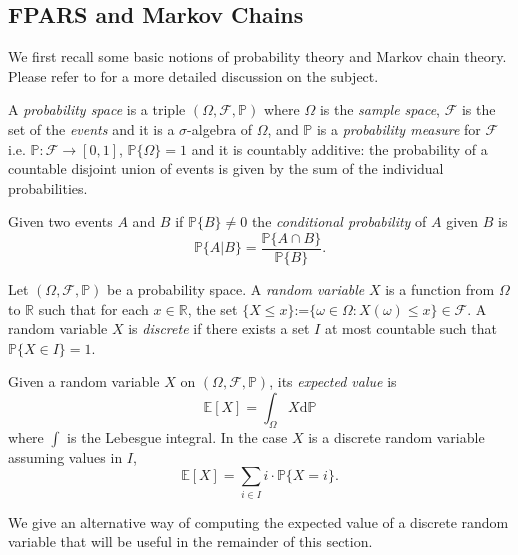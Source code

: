 \begin{LONG}
	\section{FPARS and Markov Chains}
	We first recall some basic notions of probability theory and Markov chain theory. Please refer to \cite{ash_probability_1999,norris_markov_1998} for a more detailed discussion on the subject.
	\begin{definition}
		A \emph{probability space} is a triple $(\Omega, \mathcal{F},\mathbb{P})$ where $\Omega$ is the \emph{sample space}, $\mathcal{F}$ is the set of the \emph{events} and it is a $\sigma$-algebra of $\Omega$, and $\mathbb{P}$ is a \emph{probability measure} for $\mathcal{F}$ i.e. $\mathbb{P} :\mathcal{F}\rightarrow[0,1]$, $\mathbb{P}\{\Omega\}=1$ and it is countably additive: the probability of a countable disjoint union of events is given by the sum of the individual probabilities.
	\end{definition}
	\begin{definition}
		Given two events $A$ and $B$ if $\mathbb{P}\{B\}\neq 0$ the \emph{conditional probability} of $A$ given $B$ is
		$$
		\mathbb{P}\{A|B\}=\frac{\mathbb{P}\{A\cap B\}}{\mathbb{P}\{B\}}.
		$$
	\end{definition}
	\begin{definition}
		Let $(\Omega, \mathcal{F},\mathbb{P})$ be a probability space. A \emph{random variable} $X$ is a function from $\Omega$ to $\mathbb{R}$ such that for each $x\in \mathbb{R}$, the set $\{X\leq x\}$:=$\{\omega\in\Omega : X(\omega)\leq x\}\in \mathcal{F}$. A random variable $X$ is \emph{discrete} if there exists a set $I$ at most countable such that $\mathbb{P}\{X\in I\}=1$.
	\end{definition} 
	\begin{definition}
		Given a random variable $X$ on $(\Omega, \mathcal{F},\mathbb{P})$, its \emph{expected value} is
		$$
		\mathbb{E}[X]=\int_{\Omega}X\mathrm{d}\mathbb{P}
		$$
		where $\int$ is the Lebesgue integral. In the case $X$ is a discrete random variable assuming values in $I$,
		$$
		\mathbb{E}[X]=\sum_{i\in I}i\cdot\mathbb{P}\{X=i\}.
		$$
	\end{definition}
	We give an alternative way of computing the expected value of a discrete random variable that will be useful in the remainder of this section.
	\begin{proposition}\label{prop:alt-def}

\end{proposition}
\end{LONG}
